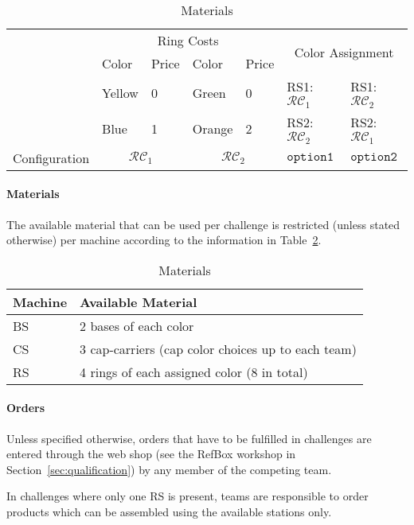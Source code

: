 \documentclass[12pt,twoside]{article}
\newcommand{\refsec}[1]{Section~\ref{#1}}
\newcommand{\reftab}[1]{Table~\ref{#1}}
\begin{document}
\newcommand{\colconfig}{\mathcal{RC}}
\begin{table}[!htb]
 \centering
 \begin{tabular}{l|l|l||l|l||l|l}
  & \multicolumn{4}{c||}{Ring Costs}
  & \multicolumn{2}{c}{\multirow{2}{*}{Color Assignment }}\\\cline{2-5}
  & Color  & Price & Color  & Price & \multicolumn{2}{c}{}\\\cline{2-7}
  & Yellow & 0 & Green & 0
  & RS1: $\colconfig_1$ & RS1: $\colconfig_2$ \\
  & Blue  & 1 & Orange & 2
  & RS2: $\colconfig_2$ & RS2: $\colconfig_1$ \\\hline\hline
  Configuration & \multicolumn{2}{c||}{$\colconfig_1$}
  & \multicolumn{2}{c||}{$\colconfig_2$}
  & $\texttt{option1}$ & $\texttt{option2}$\\
 \end{tabular}
 \caption{Materials}
 \label{tab:ring-costs}
\end{table}

\paragraph{Materials}\label{sec:materials}
The available material that can be used per challenge is restricted
(unless stated otherwise) per machine according to the information in
\reftab{tab:materials}.
\begin{table}[!htb]
 \centering
  \begin{tabularx}{\linewidth}{l|l}
   Machine & Available Material  \\\hline
   \ac{BS} & 2 bases of each color \\
   \ac{CS} & 3 cap-carriers (cap color choices up to each team)  \\
   \ac{RS} & 4 rings of each assigned color (8 in total)  \\
  \end{tabularx}
 \caption{Materials}
 \label{tab:materials}
\end{table}

\paragraph{Orders}
Unless specified otherwise, orders that have to be fulfilled in challenges
are entered through the web shop
(see the RefBox workshop in \refsec{sec:qualification})
by any member of the competing team.

In challenges where only one \ac{RS} is present, teams are responsible to
order products which can be assembled using the available stations only.
\end{document}
